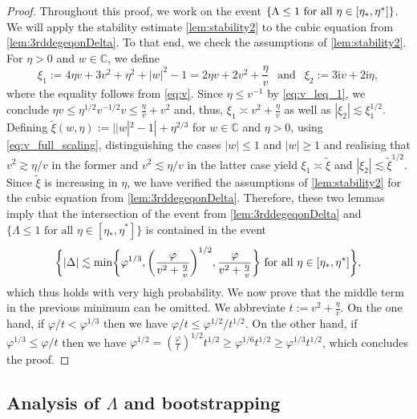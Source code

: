 \documentclass[10pt,a4paper]{amsart}
\newcommand{\ii}{\mathrm{i}}
\newcommand{\abs}[1]{\left| #1 \right|}
\newcommand{\absN}[1]{| #1 |}
\newcommand{\C}{\mathbb{C}}
\numberwithin{equation}{section}
\newcommand{\nc}{\normalcolor}
\begin{document}
	\begin{proof}
		Throughout this proof, we work on the event $\{  \Lambda \leq 1 \nc \text{ for all } \eta \in [ \eta_{\ast}, \eta^{\ast}]\}$. 
		We will apply the stability estimate \cref{lem:stability2} to the cubic equation from \cref{lem:3rddegeqonDelta}. To that end, we check the assumptions of \cref{lem:stability2}. 
		For $\eta >0$ and $w \in \C$, we define 
		\begin{equation*} \xi_1 := 4 \eta v + 3 v^2 + \eta^2 + \abs{w}^2 -1 = 2 \eta v + 2 v^{2} + \frac{\eta}{v}
			~~ \text{ and }~~ \xi_2 := 3\ii v + 2\ii \eta, 
		\end{equation*}
		where the equality follows from \eqref{eq:v}. Since $\eta \leq v^{-1}$ by \eqref{eq:v_leq_1}, 
		we conclude $\eta v \leq \eta^{1/2} v^{-1/2} v \leq \frac{\eta}{v} + v^2$ and, thus, $\xi_1 \asymp v^2 + \frac{\eta}{v}$ as well as  $\abs{\xi_2} \lesssim \xi_1^{1/2}$. Defining $\tilde{\xi}(w,\eta) := \absN{\absN{w}^2 - 1} + \eta^{2/3}$ for $w \in \C$ and $\eta>0$, using \eqref{eq:v_full_scaling}, distinguishing the cases $\abs{w} \leq 1$ and $\abs{w} \geq 1$ and realising that $v^2 \gtrsim \eta/v$ in the former and $v^2 \lesssim \eta/v$ in the latter case yield $\xi_1 \asymp \tilde{\xi}$ and $\abs{\xi_2} \lesssim \tilde{\xi}^{ 1/2 }$. Since $\tilde{\xi}$ is increasing in $\eta$, we have verified the assumptions of \cref{lem:stability2} for the cubic equation from \cref{lem:3rddegeqonDelta}. 
		Therefore, these two lemmas imply that the intersection of the event from \cref{lem:3rddegeqonDelta} and $\{ \Lambda \leq 1 \text{ for all } \eta \in [\eta_*,\eta^*]\}$ is contained in the event
		\[ 
		\biggl\{ |\Delta| \lesssim \min \biggl\{   {\varphi}^{1/3}\nc, \biggl(\frac{ {\varphi} \nc}{v^2 + \frac{\eta}{v}}\biggr)^{1/2} ,\frac{{\varphi}\nc}{v^2 + \frac{\eta}{v}}\biggr\} \text{ for all } \eta \in [\eta_*,\eta^*] 
		\biggr\},
		\] 
		which thus holds with very high probability. We now prove that the middle term in the previous minimum can be omitted. We abbreviate $t:= v^2 + \frac{\eta}{v}$. On the one hand, if $ {{\varphi}}/t<{{\varphi}}^{1/3}$ then we have
		${\varphi}/t \le {\varphi}^{1/2}/t^{1/2}$. 
		On the other hand, if ${\varphi}^{1/3}\le {\varphi}/t$ then we have
 	${\varphi}^{1/2} = \left(\frac{{\varphi}}{t}\right)^{1/2} t^{1/2} \ge {{\varphi}^{1/6}} t^{1/2}\geq  {\varphi}^{1/3}t^{1/2}$, which concludes the proof.
	\end{proof}
	
	\subsection{Analysis of $\Lambda$ and bootstrapping} 
	
\end{document}
